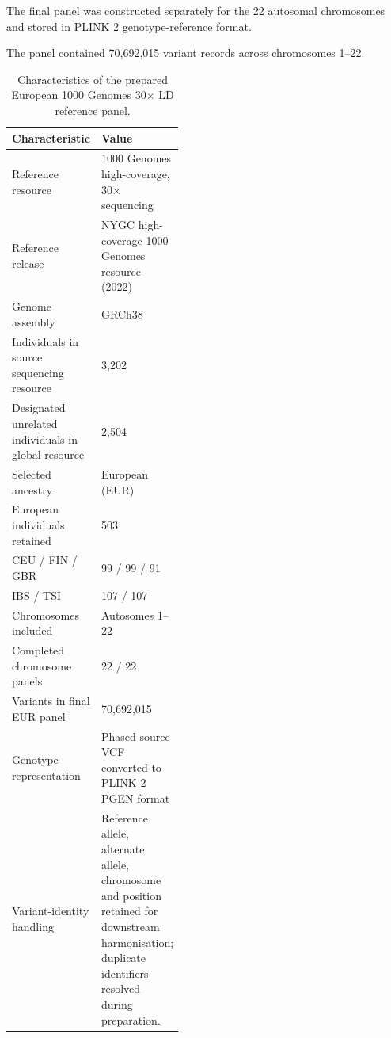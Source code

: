 \documentclass[11pt,a4paper]{article}
\begin{document}
The final panel was constructed separately for the
22 autosomal chromosomes and stored in PLINK 2
genotype-reference format.

The panel contained 70,692,015 variant records
across chromosomes 1--22.

\begin{table}[htbp]
\centering
\small
\caption{Characteristics of the prepared European
1000 Genomes 30$\times$ LD reference panel.}
\label{tab:reference_panel}

\begin{tabularx}{\linewidth}{@{}p{0.43\linewidth}X@{}}
\toprule
\textbf{Characteristic} & \textbf{Value} \\
\midrule

Reference resource &
1000 Genomes high-coverage, 30$\times$ sequencing \\

Reference release &
NYGC high-coverage 1000 Genomes resource (2022) \\

Genome assembly &
GRCh38 \\

Individuals in source sequencing resource &
3,202 \\

Designated unrelated individuals in global resource &
2,504 \\

Selected ancestry &
European (EUR) \\

European individuals retained &
503 \\

CEU / FIN / GBR &
99 / 99 / 91 \\

IBS / TSI &
107 / 107 \\

Chromosomes included &
Autosomes 1--22 \\

Completed chromosome panels &
22 / 22 \\

Variants in final EUR panel &
70,692,015 \\

Genotype representation &
Phased source VCF converted to PLINK 2 PGEN format \\

Variant-identity handling &
Reference allele, alternate allele, chromosome
and position retained for downstream harmonisation;
duplicate identifiers resolved during preparation. \\

\bottomrule
\end{tabularx}
\end{table}
\end{document}
